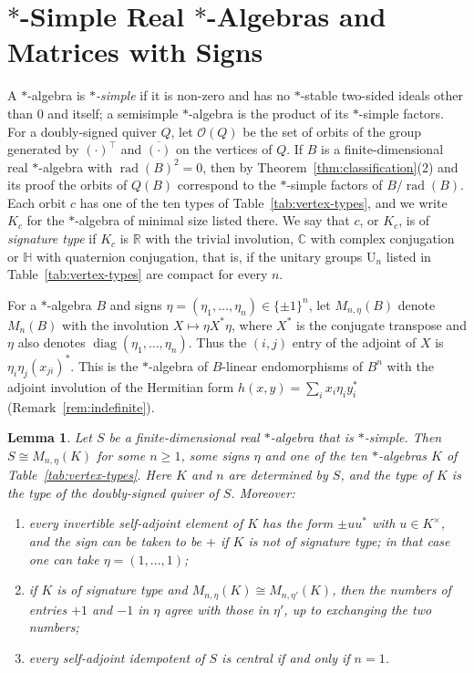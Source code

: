 \documentclass[12pt, a4paper]{report}
\theoremstyle{plain}
\newtheorem{lemma}[theorem]{Lemma}
\theoremstyle{definition}
\theoremstyle{remark}
\theoremstyle{plain}
\newcommand{\rad}[0]{\operatorname{rad}} %
\newcommand{\RR}{\mathbb{R}}
\newcommand{\CC}{\mathbb{C}}
\newcommand{\HH}{\mathbb{H}}
\newcommand{\Un}{\mathrm{U}}
\DeclareMathOperator{\diag}{diag}
\begin{document}
\section{\texorpdfstring{$*$}{*}-Simple Real \texorpdfstring{$*$}{*}-Algebras and Matrices with Signs}
\label{sec:matrices-with-signs}
A $*$-algebra is \emph{$*$-simple} if it is non-zero and has no $*$-stable two-sided ideals other than $0$ and itself; a semisimple $*$-algebra is the product of its $*$-simple factors. For a doubly-signed quiver $Q$, let $\mathcal O(Q)$ be the set of orbits of the group generated by $(\cdot)^{\top}$ and $\overline{(\cdot)}$ on the vertices of $Q$. If $B$ is a finite-dimensional real $*$-algebra with $\rad(B)^2=0$, then by Theorem~\ref{thm:classification}(2) and its proof the orbits of $Q(B)$ correspond to the $*$-simple factors of $B/\rad(B)$. Each orbit $c$ has one of the ten types of Table~\ref{tab:vertex-types}, and we write $K_c$ for the $*$-algebra of minimal size listed there. We say that $c$, or $K_c$, is of \emph{signature type} if $K_c$ is $\RR$ with the trivial involution, $\CC$ with complex conjugation or $\HH$ with quaternion conjugation, that is, if the unitary groups $\Un_n$ listed in Table~\ref{tab:vertex-types} are compact for every $n$.

For a $*$-algebra $B$ and signs $\eta=(\eta_1,\dots,\eta_n)\in\{\pm1\}^n$, let $M_{n,\eta}(B)$ denote $M_n(B)$ with the involution $X\mapsto\eta X^*\eta$, where $X^*$ is the conjugate transpose and $\eta$ also denotes $\diag(\eta_1,\dots,\eta_n)$. Thus the $(i,j)$ entry of the adjoint of $X$ is $\eta_i\eta_j(x_{ji})^*$. This is the $*$-algebra of $B$-linear endomorphisms of $B^n$ with the adjoint involution of the Hermitian form $h(x,y)=\sum_ix_i\eta_iy_i^*$ (Remark~\ref{rem:indefinite}).

\begin{lemma}\label{lem:star-simple}
Let $S$ be a finite-dimensional real $*$-algebra that is $*$-simple. Then $S\cong M_{n,\eta}(K)$ for some $n\geq1$, some signs $\eta$ and one of the ten $*$-algebras $K$ of Table~\ref{tab:vertex-types}. Here $K$ and $n$ are determined by $S$, and the type of $K$ is the type of the doubly-signed quiver of $S$. Moreover:
\begin{enumerate}
  \item every invertible self-adjoint element of $K$ has the form $\pm uu^*$ with $u\in K^\times$, and the sign can be taken to be $+$ if $K$ is not of signature type; in that case one can take $\eta=(1,\dots,1)$;
  \item if $K$ is of signature type and $M_{n,\eta}(K)\cong M_{n,\eta'}(K)$, then the numbers of entries $+1$ and $-1$ in $\eta$ agree with those in $\eta'$, up to exchanging the two numbers;
  \item every self-adjoint idempotent of $S$ is central if and only if $n=1$.
\end{enumerate}
\end{lemma}
\end{document}
